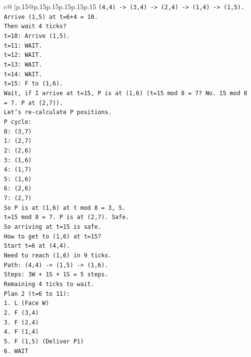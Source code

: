 \documentclass{article}
\begin{document}
{\begin{supertabular}{c@{$\;$}|p{.15\linewidth}@{}p{.15\linewidth}p{.15\linewidth}p{.15\linewidth}p{.15\linewidth}p{.15\linewidth}}
{{{\texttt{(4,4) {-}> (3,4) {-}> (2,4) {-}> (1,4) {-}> (1,5).} \\
\texttt{Arrive (1,5) at t=6+4 = 10.} \\
\texttt{Then wait 4 ticks?} \\
\texttt{t=10: Arrive (1,5).} \\
\texttt{t=11: WAIT.} \\
\texttt{t=12: WAIT.} \\
\texttt{t=13: WAIT.} \\
\texttt{t=14: WAIT.} \\
\texttt{t=15: F to (1,6).} \\
\texttt{Wait, if I arrive at t=15, P is at (1,6) (t=15 mod 8 = 7? No. 15 mod 8 = 7. P at (2,7)).} \\
\texttt{Let's re{-}calculate P positions.} \\
\texttt{P cycle:} \\
\texttt{0: (3,7)} \\
\texttt{1: (2,7)} \\
\texttt{2: (2,6)} \\
\texttt{3: (1,6)} \\
\texttt{4: (1,7)} \\
\texttt{5: (1,6)} \\
\texttt{6: (2,6)} \\
\texttt{7: (2,7)} \\
\texttt{So P is at (1,6) at t mod 8 = 3, 5.} \\
\texttt{t=15 mod 8 = 7. P is at (2,7). Safe.} \\
\texttt{So arriving at t=15 is safe.} \\
\texttt{How to get to (1,6) at t=15?} \\
\texttt{Start t=6 at (4,4).} \\
\texttt{Need to reach (1,6) in 9 ticks.} \\
\texttt{Path: (4,4) {-}> (1,5) {-}> (1,6).} \\
\texttt{Steps: 3W + 1S + 1S = 5 steps.} \\
\texttt{Remaining 4 ticks to wait.} \\
\texttt{Plan 2 (t=6 to 11):} \\
\texttt{1. L (Face W)} \\
\texttt{2. F (3,4)} \\
\texttt{3. F (2,4)} \\
\texttt{4. F (1,4)} \\
\texttt{5. F (1,5) (Deliver P1)} \\
\texttt{6. WAIT} \\
}}}
\end{supertabular}}
\end{document}
